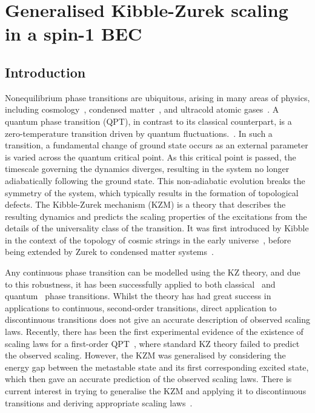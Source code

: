 \chapter{Generalised Kibble-Zurek scaling in a spin-1 BEC}\label{chap: spin-1}


\section{Introduction}
Nonequilibrium phase transitions are ubiquitous, arising in many areas of
physics, including cosmology~\cite{Kibble1980,Mazumdar2019}, condensed
matter~\cite{Chuang1991,Hendry1994,Bauerle1996,Ruutu1996,Sondhi1997,
Polkovnikov2011}, and ultracold atomic gases~\cite{Hadzibabic2006,Langen2015,
Fletcher2015,Liu2018}.
A quantum phase transition (QPT), in contrast to its classical counterpart, is a
zero-temperature transition driven by quantum fluctuations.~\cite{Sachdev2011}.
In such a transition, a fundamental change of ground state occurs as an external
parameter is varied across the quantum critical point.
As this critical point is passed, the timescale governing the dynamics diverges,
resulting in the system no longer adiabatically following the ground state.
This non-adiabatic evolution breaks the symmetry of the system, which typically
results in the formation of topological defects.
The Kibble-Zurek mechanism (KZM) is a theory that describes the resulting
dynamics and predicts the scaling properties of the excitations from the details
of the universality class of the transition.
It was first introduced by Kibble in the context of the topology of cosmic
strings in the early universe~\cite{Kibble1976, Kibble1980}, before being
extended by Zurek to condensed matter systems~\cite{Zurek1985, Zurek1993,
    Zurek1996}.

Any continuous phase transition can be modelled using the KZ theory, and due to
this robustness, it has been successfully applied to both
classical~\cite{Donadello2016,Beugnon2017} and
quantum~\cite{Dziarmaga2005, Damski2005, Lamacraft2007} phase transitions.
Whilst the theory has had great success in applications to continuous,
second-order transitions, direct application to discontinuous transitions
does not give an accurate description of observed scaling laws.
Recently, there has been the first experimental evidence of the existence of
scaling laws for a first-order QPT~\cite{Qiu2020}, where standard KZ theory
failed to predict the observed scaling.
However, the KZM was generalised by considering the energy gap between the
metastable state and its first corresponding excited state, which then gave an
accurate prediction of the observed scaling laws.
There is current interest in trying to generalise the KZM and applying it to
discontinuous transitions and deriving appropriate scaling
laws~\cite{Divakaran2008, Suzuki2015}.

